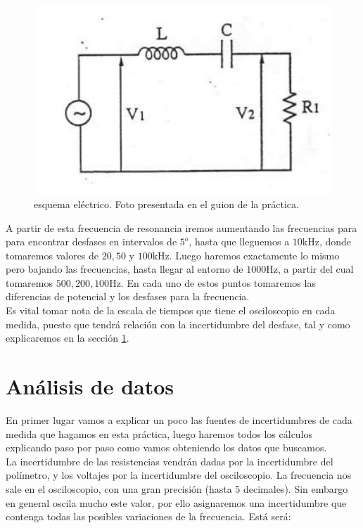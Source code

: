 \documentclass[12pt,a4paper]{article}
\newcommand{\KHz}{\mathrm{kHz} }
\newcommand{\Hz}{\mathrm{Hz} }
\begin{document}
\begin{figure}[h!] \centering
\includegraphics[scale=0.3]{RLC2.png}
\caption{esquema eléctrico. Foto presentada en el guion de la práctica.}
\end{figure}

A partir de esta frecuencia de resonancia iremos aumentando las frecuencias para para encontrar desfases en intervalos de $5^o$, hasta que lleguemos a $10$kHz, donde tomaremos valores de $20,50$ y $100 \KHz$. Luego haremos exactamente lo mismo pero bajando las frecuencias, hasta llegar al entorno de $1000\Hz$, a partir del cual tomaremos $500,200,100 \Hz$. En cada uno de estos puntos tomaremos las diferencias de potencial y los desfases para la frecuencia. \\

Es vital tomar nota de la escala de tiempos que tiene el osciloscopio en cada medida, puesto que tendrá relación con la incertidumbre del desfase, tal y como explicaremos en la sección \ref{Sec:5}.

\section{Análisis de datos} \label{Sec:5}

En primer lugar vamos a explicar un poco las fuentes de incertidumbres de cada medida que hagamos en esta práctica, luego haremos todos los cálculos explicando paso por paso como vamos obteniendo los datos que buscamos.\\


La incertidumbre de las resistencias vendrán dadas por la incertidumbre del polímetro, y los voltajes por la incertidumbre del osciloscopio. La frecuencia nos sale en el osciloscopio, con una gran precisión (hasta 5 decimales). Sin embargo en general oscila mucho este valor, por ello asignaremos una incertidumbre que contenga todas las posibles variaciones de la frecuencia. Está será:
\end{document}
